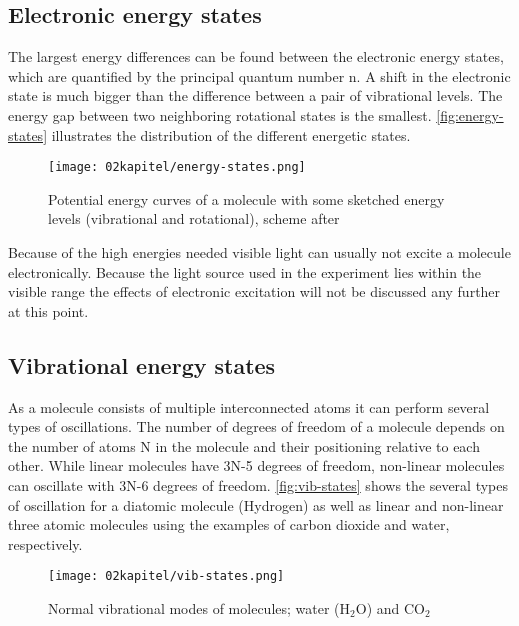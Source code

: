 \subsection{Electronic energy states}

The largest energy differences can be found between the electronic energy states, which are quantified by the principal quantum number n. A shift in the electronic state is much bigger than the difference between a pair of vibrational levels. The energy gap between two neighboring rotational states is the smallest. \autoref{fig:energy-states} illustrates the distribution of the different energetic states.

\begin{figure}[!htb]
    \centering
    \texttt{[image: 02kapitel/energy-states.png]}
    \caption[Potential energy curves with some energy levels]{Potential energy curves of a molecule with some sketched energy levels (vibrational and rotational), scheme after \autocite{brauerApplicationRamanSpectroscopy2022}}
    \label{fig:energy-states}
\end{figure}

Because of the high energies needed visible light can usually not excite a molecule electronically. Because the light source used in the experiment lies within the visible range the effects of electronic excitation will not be discussed any further at this point.

\subsection{Vibrational energy states}

As a molecule consists of multiple interconnected atoms it can perform several types of oscillations. The number of degrees of freedom of a molecule depends on the number of atoms N in the molecule and their positioning relative to each other. While linear molecules have 3N-5 degrees of freedom, non-linear molecules can oscillate with 3N-6 degrees of freedom. \autoref{fig:vib-states} shows the several types of oscillation for a diatomic molecule (Hydrogen) as well as linear and non-linear three atomic molecules using the examples of carbon dioxide and water, respectively.

\begin{figure}[!htb]
    \centering
    \texttt{[image: 02kapitel/vib-states.png]}
    \caption[Normal modes of selected molecules]{Normal vibrational modes of molecules; water ($\mathrm{H_2O}$) and $\mathrm{CO_2}$ \autocite{brauerApplicationRamanSpectroscopy2022}}
    \label{fig:vib-states}
\end{figure}

